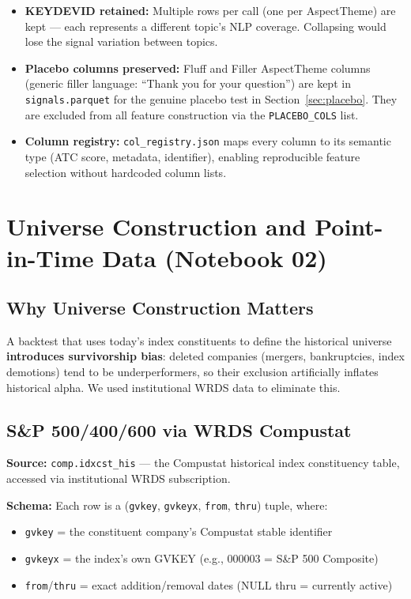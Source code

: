 \documentclass[11pt,a4paper]{article}
\begin{document}
\begin{itemize}
  \item \textbf{KEYDEVID retained:} Multiple rows per call (one per AspectTheme) are kept --- each represents a different topic's NLP coverage. Collapsing would lose the signal variation between topics.
  \item \textbf{Placebo columns preserved:} Fluff and Filler AspectTheme columns (generic filler language: ``Thank you for your question'') are kept in \texttt{signals.parquet} for the genuine placebo test in Section~\ref{sec:placebo}. They are excluded from all feature construction via the \texttt{PLACEBO\_COLS} list.
  \item \textbf{Column registry:} \texttt{col\_registry.json} maps every column to its semantic type (ATC score, metadata, identifier), enabling reproducible feature selection without hardcoded column lists.
\end{itemize}

\section{Universe Construction and Point-in-Time Data (Notebook 02)}

\subsection{Why Universe Construction Matters}

A backtest that uses today's index constituents to define the historical universe \textbf{introduces survivorship bias}: deleted companies (mergers, bankruptcies, index demotions) tend to be underperformers, so their exclusion artificially inflates historical alpha. We used institutional WRDS data to eliminate this.

\subsection{S\&P 500/400/600 via WRDS Compustat}

\textbf{Source:} \texttt{comp.idxcst\_his} --- the Compustat historical index constituency table, accessed via institutional WRDS subscription.

\textbf{Schema:} Each row is a (\texttt{gvkey}, \texttt{gvkeyx}, \texttt{from}, \texttt{thru}) tuple, where:
\begin{itemize}[nosep]
  \item \texttt{gvkey} = the constituent company's Compustat stable identifier
  \item \texttt{gvkeyx} = the index's own GVKEY (e.g., 000003 = S\&P 500 Composite)
  \item \texttt{from}/\texttt{thru} = exact addition/removal dates (NULL thru = currently active)
\end{itemize}
\end{document}
